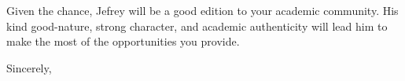 \documentclass[11pt, letterpaper]{letter} %
\begin{document}
\begin{letter}
Given the chance, Jefrey will be a good edition to your academic community. His kind good-nature, strong character, and academic authenticity will lead him to make the most of the opportunities you provide.

\closing{Sincerely,}




\end{letter}
\end{document}

